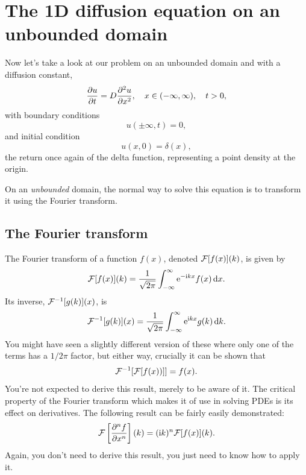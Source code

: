 \documentclass[main.tex]{subfiles}
\begin{document}
\section{The 1D diffusion equation on an unbounded domain}
Now let's take a look at our problem on an unbounded domain and with a diffusion constant,
\begin{equation}
	\pd{u}{t} = D \pdd{u}{x}, \quad x\in(-\infty,\infty), \quad t>0,
	\label{diffprob}	
\end{equation}
with boundary conditions
\begin{equation}
	u(\pm\infty,t) = 0,
\end{equation}
and initial condition
\begin{equation}
	u(x,0) = \delta(x),
\end{equation}
the return once again of the delta function, representing a point density at the origin.

On an \emph{unbounded} domain, the normal way to solve this equation is to transform it using the Fourier transform.

\subsection{The Fourier transform}
The Fourier transform of a function $f(x)$, denoted $\mathcal{F} [f(x)](k)$, is given by
\begin{equation}
\mathcal{F} [f(x)](k) = \frac{1}{\sqrt{2\pi}}\int_{-\infty}^{\infty}\mathrm{e}^{-\mathrm{i}  k x}f(x)\,\mathrm{d}x.
\end{equation}
Its inverse, $\mathcal{F} ^{-1}[g(k)](x)$, is 
\begin{equation}
\mathcal{F} ^{-1}[g(k)](x) =  \frac{1}{\sqrt{2\pi}}\int_{-\infty}^{\infty}\mathrm{e}^{\mathrm{i}  k x}g(k)\,\mathrm{d}{k}.
\end{equation}
You might have seen a slightly different version of these where only one of the terms has a $1/2\pi$ factor, but either way, crucially it can be shown that
\begin{equation}
\mathcal{F} ^{-1}[\mathcal{F} [f(x))]] = f(x).
\end{equation}
You're not expected to derive this result, merely to be aware of it. The critical property of the Fourier transform which makes it of use in solving PDEs is its effect on derivatives. The following result can be fairly easily demonstrated:
\begin{equation}
\label{fderiv}
\Four \left[\pdn{n}{f}{x}\right](k) =  (\i  k)^{n}\Four [f(x)](k).
\end{equation} 
Again, you don't need to derive this result, you just need to know how to apply it.
\end{document}
